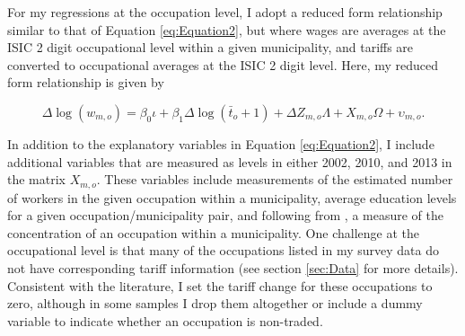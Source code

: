\documentclass[12pt]{article}
\begin{document}
For my regressions at the occupation level, I adopt a reduced form relationship similar to that
of Equation \ref{eq:Equation2}, but where wages are averages at the ISIC 2 digit occupational level
within a given municipality, and tariffs are converted to occupational averages at the ISIC 2 digit level. 
Here, my reduced form relationship is given by

\begin{equation}
\label{eq:Equation4}
\Delta\log(w_{m,o}) = \beta_0 \iota + \beta_1 \Delta\log(\bar{t}_{o}+1)+ \Delta Z_{m,o} \Lambda
+X_{m,o} \Omega+\upsilon_{m,o}.
\end{equation}

In addition to the explanatory variables in Equation \ref{eq:Equation2}, I include additional variables 
that are measured as levels in either 2002, 2010, and 2013 in the matrix $X_{m,o}$. 
These variables include measurements of the estimated number of workers in the given occupation
within a municipality, average education levels for a given occupation/municipality pair, and 
following from \citet{holmes1}, a measure of the concentration of an occupation within a municipality.
One challenge at the occupational level is that many of the occupations listed in my survey data do
not have corresponding tariff information (see section \ref{sec:Data} for more details). Consistent 
with the literature, I set the tariff change for these occupations to zero, although in some samples I 
drop them altogether or include a dummy variable to indicate whether an occupation is non-traded.
\end{document}

